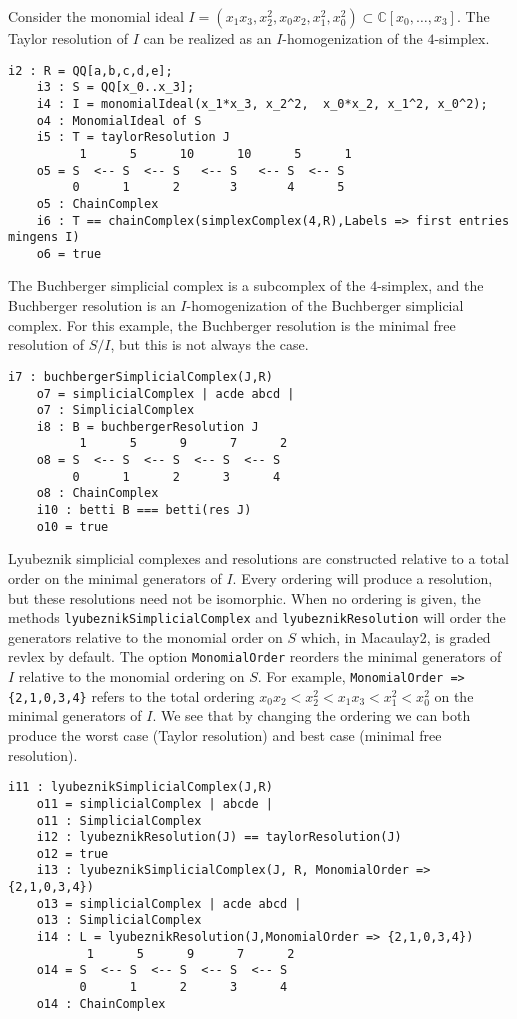 \documentclass[12pt,leqno]{amsart}
\theoremstyle{definition}
\begin{document}
Consider the monomial ideal
$I = (x_1x_3, x_2^2, x_0x_2, x_1^2, x_0^2) \subset \mathbb
C[x_0,\dotsc,x_3]$. The Taylor resolution of $I$ can be realized as an
$I$-homogenization of the $4$-simplex.
%  
\begin{lstlisting}[basicstyle={\ttfamily \scriptsize}, xleftmargin=-23pt]
    i2 : R = QQ[a,b,c,d,e];
    i3 : S = QQ[x_0..x_3];
    i4 : I = monomialIdeal(x_1*x_3, x_2^2,  x_0*x_2, x_1^2, x_0^2);
    o4 : MonomialIdeal of S
    i5 : T = taylorResolution J
          1      5      10      10      5      1
    o5 = S  <-- S  <-- S   <-- S   <-- S  <-- S
         0      1      2       3       4      5
    o5 : ChainComplex
    i6 : T == chainComplex(simplexComplex(4,R),Labels => first entries mingens I)
    o6 = true
\end{lstlisting}
  The Buchberger simplicial complex is a subcomplex of the $4$-simplex, and the Buchberger resolution is an $I$-homogenization of the Buchberger simplicial complex. For this example, the Buchberger resolution is the minimal free resolution of $S/I$, but this is not always the case.
\begin{lstlisting}[basicstyle={\ttfamily \scriptsize}, xleftmargin=-23pt]
    i7 : buchbergerSimplicialComplex(J,R)
    o7 = simplicialComplex | acde abcd |
    o7 : SimplicialComplex
    i8 : B = buchbergerResolution J
          1      5      9      7      2
    o8 = S  <-- S  <-- S  <-- S  <-- S
         0      1      2      3      4
    o8 : ChainComplex
    i10 : betti B === betti(res J)
    o10 = true
\end{lstlisting}
Lyubeznik simplicial complexes and resolutions are constructed relative to a total order on the minimal generators of $I$. Every ordering will produce a resolution, but these resolutions need not be isomorphic. When no ordering is given, the methods \texttt{lyubeznikSimplicialComplex} and \texttt{lyubeznikResolution} will order the generators relative to the monomial order on $S$ which, in Macaulay2, is graded revlex by default. The option \texttt{MonomialOrder} reorders the minimal generators of $I$ relative to the monomial ordering on $S$. For example, \texttt{MonomialOrder => \{2,1,0,3,4\}} refers to the total ordering $x_0x_2 <  x_2^2 < x_1x_3 < x_1^2 < x_0^2$ on the minimal generators of $I$. We see that by changing the ordering we can both produce the worst case (Taylor resolution) and best case (minimal free resolution).
\begin{lstlisting}[basicstyle={\ttfamily \scriptsize}, xleftmargin=-23pt]
    i11 : lyubeznikSimplicialComplex(J,R)
    o11 = simplicialComplex | abcde |
    o11 : SimplicialComplex
    i12 : lyubeznikResolution(J) == taylorResolution(J)
    o12 = true
    i13 : lyubeznikSimplicialComplex(J, R, MonomialOrder => {2,1,0,3,4})
    o13 = simplicialComplex | acde abcd |
    o13 : SimplicialComplex
    i14 : L = lyubeznikResolution(J,MonomialOrder => {2,1,0,3,4})
           1      5      9      7      2
    o14 = S  <-- S  <-- S  <-- S  <-- S
          0      1      2      3      4
    o14 : ChainComplex
\end{lstlisting}
\end{document}
